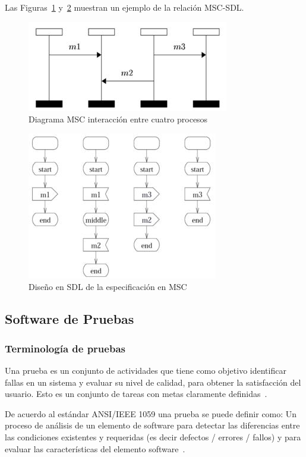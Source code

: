 Las Figuras~\ref{fig:DiagramaMSC} y~\ref{fig:trasl_SDL} muestran un ejemplo de la relaci\'on MSC-SDL.

\begin{figure}[!h]
  \centering
  \includegraphics[scale=0.7]{./images/DiagramaMSC.jpg}
  \caption{Diagrama MSC interacci\'on entre cuatro procesos}
  \label{fig:DiagramaMSC}
\end{figure}

\begin{figure}[H]
  \centering
  \includegraphics[scale=0.7]{./images/trasl_SDL.jpg}
  \caption{Dise\~no en SDL de la especificaci\'on en MSC}
  \label{fig:trasl_SDL}
\end{figure}



\subsection{Software de Pruebas}
\subsubsection{Terminolog\'ia de pruebas}

Una prueba es un conjunto de actividades que tiene como objetivo identificar 
fallas en un sistema y evaluar su nivel de calidad, para obtener la 
satisfacci\'on del usuario. Esto es un conjunto de tareas con metas claramente 
definidas~\cite{Homes2013}.

De acuerdo al est\'andar ANSI/IEEE 1059 una prueba se puede definir como: Un 
proceso de an\'alisis de un elemento de software para detectar las diferencias 
entre las condiciones existentes y requeridas (es decir defectos / errores / 
fallos) y para evaluar las caracter\'isticas del elemento 
software~\cite{IEEE1994}.

